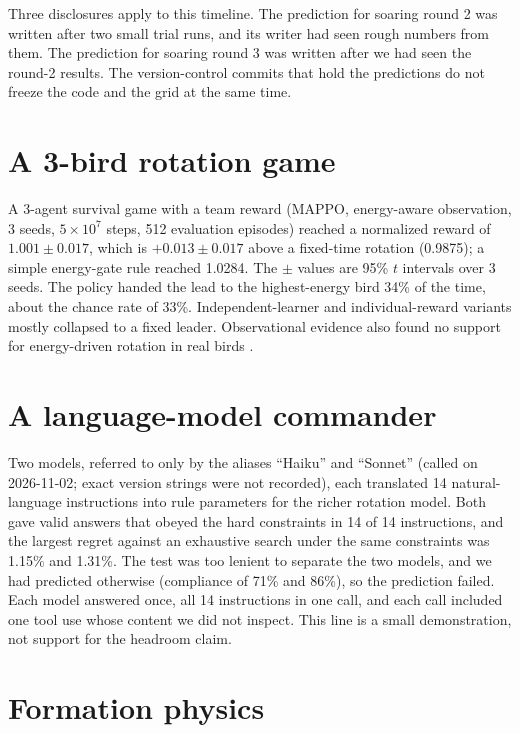 \documentclass[11pt]{article}
\begin{document}
Three disclosures apply to this timeline.
The prediction for soaring round 2 was written after two small trial runs, and its writer had seen rough numbers from them.
The prediction for soaring round 3 was written after we had seen the round-2 results.
The version-control commits that hold the predictions do not freeze the code and the grid at the same time.


\section{A 3-bird rotation game}
\label{app:birds}

A 3-agent survival game with a team reward (MAPPO, energy-aware observation, 3 seeds, $5\times 10^7$ steps, 512 evaluation episodes) reached a normalized reward of $1.001 \pm 0.017$, which is $+0.013 \pm 0.017$ above a fixed-time rotation (0.9875); a simple energy-gate rule reached 1.0284.
The $\pm$ values are 95\% $t$ intervals over 3 seeds.
The policy handed the lead to the highest-energy bird 34\% of the time, about the chance rate of 33\%.
Independent-learner and individual-reward variants mostly collapsed to a fixed leader.
Observational evidence also found no support for energy-driven rotation in real birds \citep{voelkl2015}.

\section{A language-model commander}
\label{app:llm}

Two models, referred to only by the aliases ``Haiku'' and ``Sonnet'' (called on 2026-11-02; exact version strings were not recorded), each translated 14 natural-language instructions into rule parameters for the richer rotation model.
Both gave valid answers that obeyed the hard constraints in 14 of 14 instructions, and the largest regret against an exhaustive search under the same constraints was 1.15\% and 1.31\%.
The test was too lenient to separate the two models, and we had predicted otherwise (compliance of 71\% and 86\%), so the prediction failed.
Each model answered once, all 14 instructions in one call, and each call included one tool use whose content we did not inspect.
This line is a small demonstration, not support for the headroom claim.

\section{Formation physics}
\label{app:formation}
\end{document}
